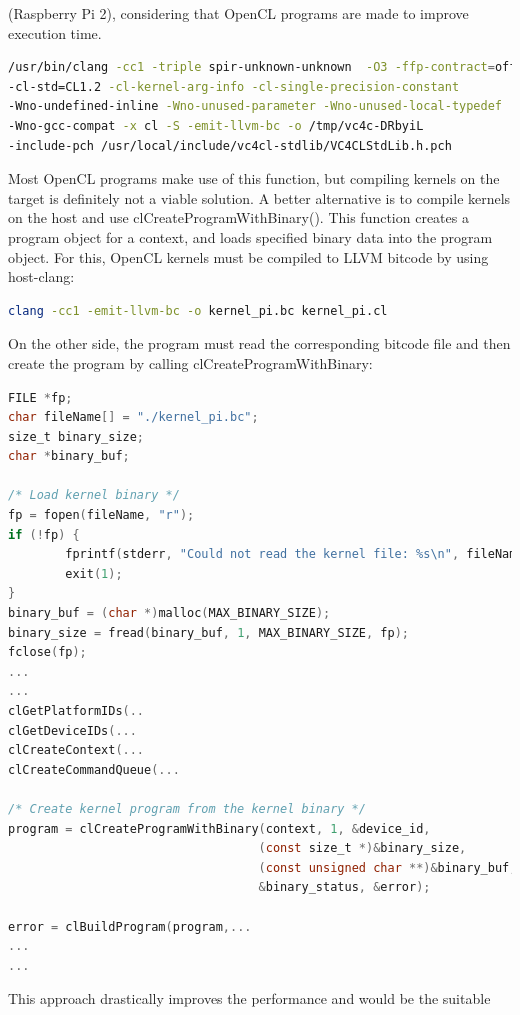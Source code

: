 \documentclass[12pt,a4paper,oneside]{article}
\begin{document}
(Raspberry Pi 2), considering that OpenCL programs are made to improve execution time.
\begin{lstlisting}[language=sh,caption={Clang invocation by clCreateProgramWithSource() },captionpos=b,keywords={}]
/usr/bin/clang -cc1 -triple spir-unknown-unknown  -O3 -ffp-contract=off
-cl-std=CL1.2 -cl-kernel-arg-info -cl-single-precision-constant
-Wno-undefined-inline -Wno-unused-parameter -Wno-unused-local-typedef
-Wno-gcc-compat -x cl -S -emit-llvm-bc -o /tmp/vc4c-DRbyiL
-include-pch /usr/local/include/vc4cl-stdlib/VC4CLStdLib.h.pch
\end{lstlisting}
Most OpenCL programs make use of this function, but compiling kernels on the
target is definitely not a viable solution. A better alternative is to compile
kernels on the host and use clCreateProgramWithBinary(). This function creates a
program object for a context, and loads specified binary data into the program
object. For this, OpenCL kernels must be compiled to LLVM bitcode by using host-clang:
\begin{lstlisting}[language=sh,caption={Compiling OpenCL C to LLVM bitcode},captionpos=b,keywords={}]
clang -cc1 -emit-llvm-bc -o kernel_pi.bc kernel_pi.cl
\end{lstlisting}
On the other side, the program must read the corresponding bitcode file and then
create the program by calling clCreateProgramWithBinary:
\begin{lstlisting}[language=C,caption={Example using clCreateProgramWithBinary},captionpos=b,showstringspaces=false]
FILE *fp;
char fileName[] = "./kernel_pi.bc";
size_t binary_size;
char *binary_buf;

/* Load kernel binary */
fp = fopen(fileName, "r");
if (!fp) {
        fprintf(stderr, "Could not read the kernel file: %s\n", fileName);
        exit(1);
}
binary_buf = (char *)malloc(MAX_BINARY_SIZE);
binary_size = fread(binary_buf, 1, MAX_BINARY_SIZE, fp);
fclose(fp);
...
...
clGetPlatformIDs(..
clGetDeviceIDs(...
clCreateContext(...
clCreateCommandQueue(...

/* Create kernel program from the kernel binary */
program = clCreateProgramWithBinary(context, 1, &device_id,
                                   (const size_t *)&binary_size,
                                   (const unsigned char **)&binary_buf,
                                   &binary_status, &error);

error = clBuildProgram(program,...
...
...
\end{lstlisting}
This approach drastically improves the performance and would be the suitable
\end{document}
